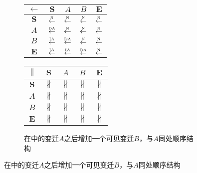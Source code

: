 \begin{figure}[htbp]
\begin{subfigure}{1\textwidth}
\begin{minipage}[b]{0.3\textwidth}
      \vspace{1em}
      \centering
      \begin{tabular}{|c|c|c|c|c|} \hline
        $\leftarrow$ & $\bm{S}$ & $A$ & $B$ & $\bm{E}$\\ \hline
        $\bm{S}$ & $\overset{\text{\tiny{N}}}{\leftarrow}$ & $\overset{\text{\tiny{N}}}{\leftarrow}$ & $\overset{\text{\tiny{N}}}{\leftarrow}$ & $\overset{\text{\tiny{N}}}{\leftarrow}$\\ \hline
        $A$ & $\overset{\text{\tiny{DA}}}{\leftarrow}$ & $\overset{\text{\tiny{N}}}{\leftarrow}$ & $\overset{\text{\tiny{N}}}{\leftarrow}$ & $\overset{\text{\tiny{N}}}{\leftarrow}$\\ \hline
        $B$ & $\overset{\text{\tiny{IA}}}{\leftarrow}$ & $\overset{\text{\tiny{DA}}}{\leftarrow}$ & $\overset{\text{\tiny{N}}}{\leftarrow}$ & $\overset{\text{\tiny{N}}}{\leftarrow}$\\ \hline
        $\bm{E}$ & $\overset{\text{\tiny{IA}}}{\leftarrow}$ & $\overset{\text{\tiny{IA}}}{\leftarrow}$ & $\overset{\text{\tiny{DA}}}{\leftarrow}$ & $\overset{\text{\tiny{N}}}{\leftarrow}$\\ \hline
      \end{tabular}
    \end{minipage}
    \begin{minipage}[b]{0.3\textwidth}
      \vspace{1em}
      \centering
      \begin{tabular}{|c|c|c|c|c|} \hline
        $\parallel$ & $\bm{S}$ & $A$ & $B$ & $\bm{E}$\\ \hline
        $\bm{S}$ & $\nparallel$ & $\nparallel$ & $\nparallel$ & $\nparallel$\\ \hline
        $A$ & $\nparallel$ & $\nparallel$ & $\nparallel$ & $\nparallel$\\ \hline
        $B$ & $\nparallel$ & $\nparallel$ & $\nparallel$ & $\nparallel$\\ \hline
        $\bm{E}$ & $\nparallel$ & $\nparallel$ & $\nparallel$ & $\nparallel$\\ \hline
      \end{tabular}
    \end{minipage}
    \caption{在中的变迁$A$之后增加一个可见变迁$B$，与$A$同处顺序结构}
    \label{fig:uniqueness_2_b}
  \end{subfigure}


\end{figure}
